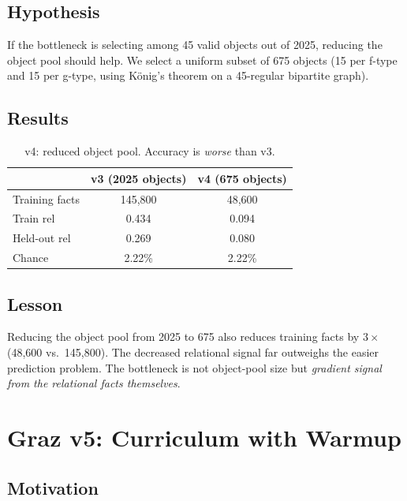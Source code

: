 \documentclass[11pt]{article}
\begin{document}
\subsection{Hypothesis}

If the bottleneck is selecting among 45 valid objects out of 2025, reducing the object
pool should help.  We select a uniform subset of 675 objects (15 per f-type and 15 per
g-type, using K\"onig's theorem on a 45-regular bipartite graph).

\subsection{Results}

\begin{table}[h]
\centering
\caption{v4: reduced object pool. Accuracy is \emph{worse} than v3.}
\begin{tabular}{lcc}
\toprule
& v3 (2025 objects) & v4 (675 objects) \\
\midrule
Training facts & 145,800 & 48,600 \\
Train rel & 0.434 & 0.094 \\
Held-out rel & 0.269 & 0.080 \\
Chance & 2.22\% & 2.22\% \\
\bottomrule
\end{tabular}
\end{table}

\subsection{Lesson}

Reducing the object pool from 2025 to 675 also reduces training facts by $3\times$
(48,600 vs.\ 145,800).  The decreased relational signal far outweighs the easier
prediction problem.  The bottleneck is not object-pool size but \emph{gradient signal
from the relational facts themselves}.

\section{Graz v5: Curriculum with Warmup}
\label{sec:v5}

\subsection{Motivation}
\end{document}
